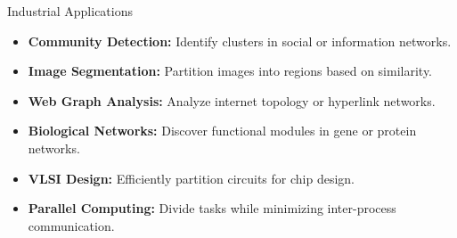 \documentclass[aspectratio=169]{beamer}
\begin{document}
\begin{frame}{Industrial Applications}
    \begin{itemize}
        \item \textbf{Community Detection:} Identify clusters in social or information networks.
        \item \textbf{Image Segmentation:} Partition images into regions based on similarity.
        \item \textbf{Web Graph Analysis:} Analyze internet topology or hyperlink networks.
        \item \textbf{Biological Networks:} Discover functional modules in gene or protein networks.
        \item \textbf{VLSI Design:} Efficiently partition circuits for chip design.
        \item \textbf{Parallel Computing:} Divide tasks while minimizing inter-process communication.
    \end{itemize}
\end{frame}
\end{document}
